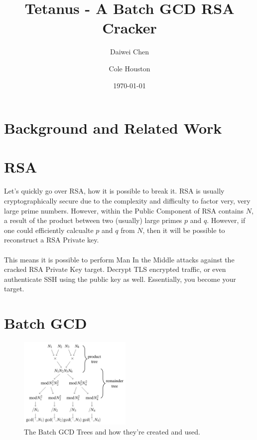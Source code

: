 \documentclass[10pt, letterpaper]{article}
\title{Tetanus - A Batch GCD RSA Cracker}
\author{Daiwei Chen \and Cole Houston}
\date{\today}
\begin{document}
\maketitle
\begin{abstract}

\end{abstract}

\section{Background and Related Work}


\section{RSA}
Let's quickly go over RSA, how it is possible to break it. RSA is usually cryptographically secure due to the complexity and difficulty to factor very, very large prime numbers. However, within the Public Component of RSA contains $N$, a result of the product between two (usually) large primes $p$ and $q$. However, if one could efficiently calcualte $p$ and $q$ from $N$, then it will be possible to reconstruct a RSA Private key. \\
\\
This means it is possible to perform Man In the Middle attacks against the cracked RSA Private Key target. Decrypt TLS encrypted traffic, or even authenticate SSH using the public key as well. Essentially, you become your target.

\section{Batch GCD}
\begin{figure}
  \begin{center}
    \includegraphics[width=0.48\textwidth]{batch-gcd-tree.png}
  \end{center}
  \caption{The Batch GCD Trees and how they're created and used.}
\end{figure}
\end{document}
